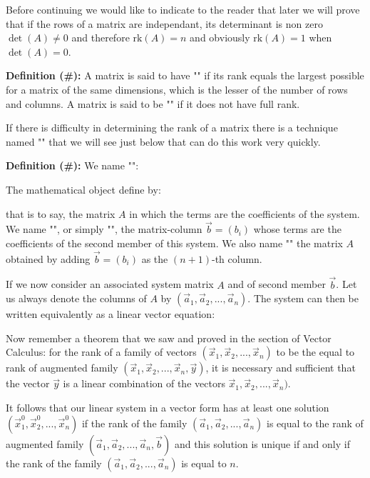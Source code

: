 	Before continuing we would like to indicate to the reader that later we will prove that if the rows of a matrix are independant, its determinant is non zero $\det(A)\neq 0$ and therefore $\text{rk}(A)=n$ and obviously $\text{rk}(A)=1$ when $\det(A)=0$.
	
	\textbf{Definition (\#\mydef):} A matrix is said to have "" if its rank equals the largest possible for a matrix of the same dimensions, which is the lesser of the number of rows and columns. A matrix is said to be "" if it does not have full rank.
	
	\begin{tcolorbox}[title=Remark,colframe=black,arc=10pt]
	If there is difficulty in determining the rank of a matrix there is a technique named "" that we will see just below that can do this work very quickly.
	\end{tcolorbox}
	\textbf{Definition (\#\mydef):} We name "":
	
	The mathematical object define by:
	
	that is to say, the matrix $A$ in which the terms are the coefficients of the system. We name "", or simply "", the matrix-column $\vec{b}=(b_i)$ whose terms are the coefficients of the second member of this system. We also name "" the matrix $A$ obtained by adding $\vec{b}=(b_i)$ as the $(n + 1)$-th column.
	
	If we now consider an associated  system matrix $A$ and of second member $\vec{b}$. Let us always denote the columns of $A$ by $(\vec{a}_1,\vec{a}_2,...,\vec{a}_n)$. The system can then be written equivalently as a linear vector equation:
	
	Now remember a theorem that we saw and proved in the section of Vector Calculus: for the rank of a family of vectors $(\vec{x}_1,\vec{x}_2,...,\vec{x}_n)$ to be the equal to rank of augmented family $(\vec{x}_1,\vec{x}_2,...,\vec{x}_n,\vec{y})$, it is necessary and sufficient that the vector $\vec{y}$ is a linear combination of the vectors $\vec{x}_1,\vec{x}_2,...,\vec{x}_n)$.
	
	It follows that our linear system in a vector form has at least one solution $(\vec{x}_1^0,\vec{x}_2^0,...,\vec{x}_n^0)$ if the rank of the family $(\vec{a}_1,\vec{a}_2,...,\vec{a}_n)$ is equal to the rank of augmented family $(\vec{a}_1,\vec{a}_2,...,\vec{a}_n,\vec{b})$ and this solution is unique if and only if the rank of the family $(\vec{a}_1,\vec{a}_2,...,\vec{a}_n)$ is equal to $n$.
	
